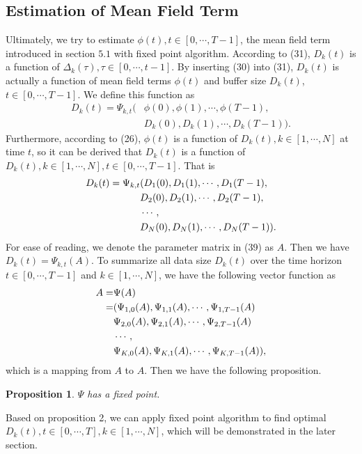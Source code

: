 \documentclass{article}
\theoremstyle{plain}
\newtheorem{proposition}[theorem]{Proposition}
\theoremstyle{definition}
\theoremstyle{remark}
\begin{document}
\subsection{Estimation of Mean Field Term}
Ultimately, we try to estimate $\phi(t), t\in[0,\cdots,T-1]$, the mean field term introduced in section $5.1$ with fixed point algorithm.
According to (31), $D_k(t)$ is a function of $\Delta_k(\tau), \tau \in [0,\cdots,t-1]$. By inserting (30) into (31), $D_k(t)$ is actually a function of mean field terms $\phi(t)$ and buffer size $D_k(t)$, $t \in [0, \cdots, T-1]$.
We define this function as
\begin{align*}
  D_k(t) = \Psi_{k,t}( & \phi(0), \phi(1), \cdots, \phi(T-1), \\
                       & D_k(0), D_k(1), \cdots, D_k(T-1)).
\end{align*}
Furthermore, according to (26), $\phi(t)$ is a function of $D_k(t), k \in [1, \cdots, N]$ at time $t$, so it can be derived that $D_k(t)$ is a function of $D_k(t), k \in [1, \cdots, N], t \in [0, \cdots, T-1]$. That is
\begin{align}
  D_k(t) = \Psi_{k,t} & (D_1(0), D_1(1), \cdots, D_1(T-1), \notag \\
                      & D_2(0), D_2(1), \cdots, D_2(T-1), \notag \\
                      & \cdots, \notag \\
                      & D_N(0), D_N(1), \cdots, D_N(T-1)).
\end{align}
For ease of reading, we denote the parameter matrix in (39) as $A$. Then we have $D_k(t) = \Psi_{k,t}(A)$.
To summarize all data size $D_k(t)$ over the time horizon $t \in [0, \cdots, T-1]$ and $k \in [1, \cdots, N]$, we have the following vector function as
\begin{align}
  A = & \Psi(A) \notag \\
    = & (\Psi_{1, 0}(A), \Psi_{1, 1}(A), \cdots, \Psi_{1, T-1}(A) \notag \\
      & \Psi_{2, 0}(A), \Psi_{2, 1}(A), \cdots, \Psi_{2, T-1}(A) \notag \\
      & \cdots, \notag \\
      & \Psi_{K, 0}(A), \Psi_{K, 1}(A), \cdots, \Psi_{K, T-1}(A)),
\end{align}
which is a mapping from $A$ to $A$.
Then we have the following proposition.
\begin{proposition}
  $\Psi$ has a fixed point.
\end{proposition}
Based on proposition 2, we can apply fixed point algorithm to find optimal $D_k(t), t \in [0,\cdots,T], k \in [1, \cdots, N]$, which will be demonstrated in the later section.
\end{document}
